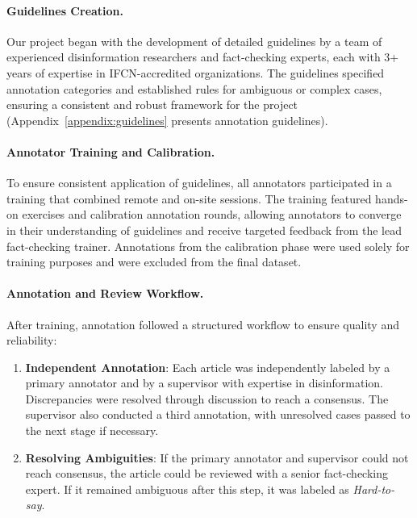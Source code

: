 \documentclass[11pt]{article}
\begin{document}
\paragraph{Guidelines Creation.}

Our project began with the development of detailed guidelines by a team of experienced disinformation researchers and fact-checking experts, each with 3+ years of expertise in IFCN-accredited organizations. The guidelines specified annotation categories and established rules for ambiguous or complex cases, ensuring a consistent and robust framework for the project (\mbox{Appendix \ref{appendix:guidelines}} presents annotation guidelines).

\paragraph{Annotator Training and Calibration.}
To ensure consistent application of guidelines, all annotators participated in a training that combined remote and on-site sessions. The training featured hands-on exercises and calibration annotation rounds, allowing annotators to converge in their understanding of guidelines and receive targeted feedback from the lead fact-checking trainer. Annotations from the calibration phase were used solely for training purposes and were excluded from the final dataset.

\paragraph{Annotation and Review Workflow.}
After training, annotation followed a structured workflow to ensure quality and reliability:
\begin{enumerate}[nosep, leftmargin=*]  
    \item \textbf{Independent Annotation}: Each article was independently labeled by a primary annotator and by a supervisor with expertise in disinformation. Discrepancies were resolved through discussion to reach a consensus. The supervisor also conducted a third annotation, with unresolved cases passed to the next stage if necessary.
    \item \textbf{Resolving Ambiguities}:  If the primary annotator and supervisor could not reach consensus, the article could be reviewed with a senior fact-checking expert. If it remained ambiguous after this step, it was labeled as \textit{Hard-to-say}.
\end{enumerate}
\end{document}
